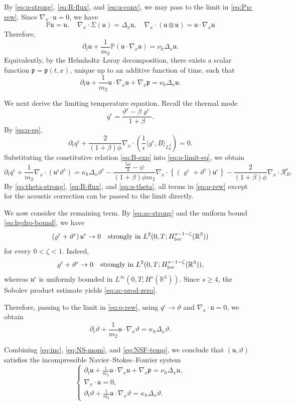 \documentclass[10pt,reqno]{amsart}
\numberwithin{equation}{section}
\newcommand{\lt}{\left}
\newcommand{\rt}{\right}
\newcommand{\lal}{\langle}
\newcommand{\ral}{\rangle}
\newcommand{\mP}{\mathbb{P}}
\newcommand{\vrh}{\varrho}
\newcommand{\vth}{\vartheta}
\newcommand{\mfu}{\mathfrak{u}}
\newcommand{\R}{\mathbb R}
\newcommand{\bq}{\begin{equation}}
\newcommand{\eq}{\end{equation}}
\newcommand{\pa}{\partial}
\newcommand{\calR}{\mathcal R}
\begin{document}
By \eqref{eq:u-strong}, \eqref{eq:R-flux}, and \eqref{eq:u-conv}, we may pass to the limit in \eqref{eq:Pu-rew}. Since $\nabla_x\cdot\mfu=0$, we have
\[
\mP\mfu=\mfu, \quad \nabla_x\cdot\Sigma(\mfu)=\Delta_x\mfu, \quad \nabla_x\cdot\lt(\mfu\otimes\mfu\rt)=\mfu\cdot\nabla_x\mfu
\]
Therefore,
\[
\pa_t\mfu+\frac{1}{m_2 }\mP\lt(\mfu\cdot\nabla_x\mfu\rt)=\nu_\hbar\Delta_x\mfu.
\]
Equivalently, by the Helmholtz--Leray decomposition, there exists a scalar function $\mathfrak p=\mathfrak p(t,x)$, unique up to an additive function of time, such that
\bq\label{eq:NS-mom}
\pa_t\mfu+\frac{1}{m_2 }\mfu\cdot\nabla_x\mfu+\nabla_x\mathfrak p=\nu_\hbar\Delta_x\mfu.
\eq

We next derive the limiting temperature equation. Recall the thermal mode
\[
q^\epsilon=\frac{\vth^\epsilon-\beta \vrh^\epsilon}{1+\beta }.
\]
By \eqref{eq:q-eq},
\bq\label{eq:q-limit-eq}
\pa_tq^\epsilon+\frac{2}{(1+\beta )\phi }\nabla_x\cdot\lt(\frac{1}{\epsilon}\lal g^\epsilon,B \ral_{L^2_p}\rt)=0.
\eq
Substituting the constitutive relation \eqref{eq:B-exp} into \eqref{eq:q-limit-eq}, we obtain
\bq\label{eq:q-rew}
\pa_tq^\epsilon+\frac{1}{m_2 }\nabla_x\cdot\lt(\mfu^\epsilon\vth^\epsilon\rt) = \kappa_\hbar\Delta_x\vth^\epsilon-\frac{\frac{5\phi }{3}-\psi}{(1+\beta )\phi  m_2 }\nabla_x\cdot\lt\{\lt(\vrh^\epsilon+\vth^\epsilon\rt)\mfu^\epsilon\rt\} -\frac{2}{(1+\beta )\phi }\nabla_x\cdot\calR_B^\epsilon.
\eq
By \eqref{eq:theta-strong}, \eqref{eq:R-flux}, and \eqref{eq:u-theta}, all terms in \eqref{eq:q-rew} except for the acoustic correction can be passed to the limit directly.

We now consider the remaining term. By \eqref{eq:ac-strong} and the uniform bound \eqref{eq:hydro-bound}, we have
\bq\label{eq:ac-prod-zero}
\lt( \vrh^\epsilon + \vth^\epsilon \rt) \mfu^\epsilon \to 0 \quad \text{strongly in } L^2 ( 0,T; H^{s-1-\zeta}_{\rm loc} (\R^3) )
\eq
for every $0<\zeta<1$. Indeed,
\[
\vrh^\epsilon + \vth^\epsilon \to 0 \quad \text{strongly in } L^2 ( 0,T; H^{s-1-\zeta}_{\rm loc} (\R^3) ),
\]
whereas $\mfu^\epsilon$ is uniformly bounded in $L^\infty \lt( 0,T; H^s(\R^3) \rt)$. Since $s\ge4$, the Sobolev product estimate yields \eqref{eq:ac-prod-zero}.

Therefore, passing to the limit in \eqref{eq:q-rew}, using $q^\epsilon \to \vth$ and $\nabla_x \cdot \mfu = 0$, we obtain
\bq\label{eq:NSF-temp} 
\pa_t \vth + \frac{1}{m_2 } \mfu \cdot \nabla_x \vth = \kappa_\hbar \Delta_x \vth.
\eq
 


Combining \eqref{eq:inc}, \eqref{eq:NS-mom}, and \eqref{eq:NSF-temp}, we conclude that $(\mfu,\vth)$ satisfies the incompressible Navier--Stokes--Fourier system
\[%
\begin{cases}
\displaystyle \pa_t\mfu+\frac{1}{m_2 }\mfu\cdot\nabla_x\mfu+\nabla_x\mathfrak p=\nu_\hbar\Delta_x\mfu,\\[2mm]
\displaystyle \nabla_x\cdot\mfu=0,\\[2mm]
\displaystyle \pa_t\vth+\frac{1}{m_2 }\mfu\cdot\nabla_x\vth=\kappa_\hbar\Delta_x\vth.
\end{cases}
\]%
\end{document}

